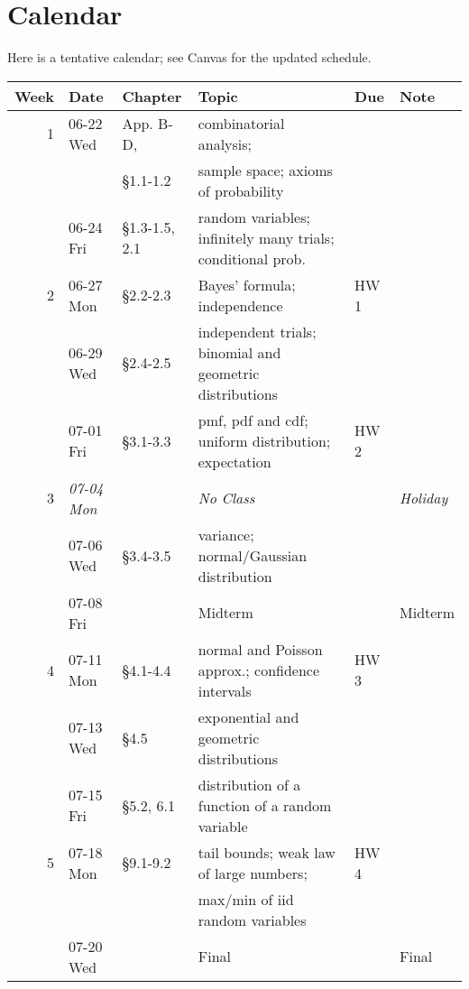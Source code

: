 \documentclass{article}
\begin{document}
\section{Calendar}
\label{sec:org5fd0cdc}
Here is a tentative calendar; see Canvas for the updated schedule.

\begin{center}
\begin{tabular}{rlllll}
Week & Date & Chapter & Topic & Due & Note\\
\hline
1 & 06-22 Wed & App. B-D, & combinatorial analysis; &  & \\
 & & \S 1.1-1.2 & sample space; axioms of probability &  & \\
 & 06-24 Fri & \S 1.3-1.5, 2.1 & random variables; infinitely many trials; conditional prob. &  & \\
\hline
2 & 06-27 Mon & \S 2.2-2.3 & Bayes' formula; independence & HW 1 & \\
 & 06-29 Wed & \S 2.4-2.5 & independent trials; binomial and geometric distributions &  & \\
 & 07-01 Fri & \S 3.1-3.3 & pmf, pdf and cdf; uniform distribution; expectation & HW 2 & \\
\hline
3 & \textit{07-04 Mon} &  & \textit{No Class} &  & \textit{Holiday}\\
 & 07-06 Wed & \S 3.4-3.5 & variance; normal/Gaussian distribution &  & \\
 & 07-08 Fri &  & Midterm &  & Midterm\\
\hline
4 & 07-11 Mon & \S 4.1-4.4 & normal and Poisson approx.; confidence intervals & HW 3 & \\
 & 07-13 Wed & \S4.5 & exponential and geometric distributions &  & \\
 & 07-15 Fri & \S5.2, 6.1 & distribution of a function of a random variable &  & \\
\hline
5 & 07-18 Mon & \S9.1-9.2 & tail bounds; weak law of large numbers; & HW 4 & \\
 &  &  & max/min of iid random variables &  & \\
 & 07-20 Wed &  & Final &  & Final\\
\hline
\end{tabular}
\end{center}








\newpage
\end{document}
